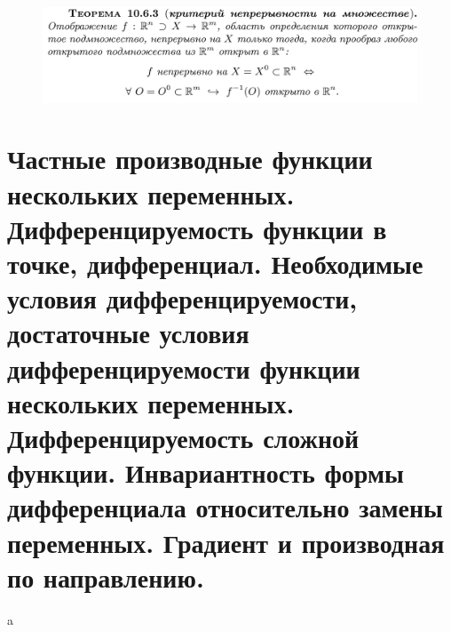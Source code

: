\documentclass{article}
\begin{document}
\newpage
\begin{figure}[h!]
    \centering
    \includegraphics[width=\textwidth]{32.png}
    \vspace{-1cm}
\end{figure}

\newpage
\section{\color{RedViolet}\textbf{Частные производные функции нескольких переменных. Дифференцируемость функции в точке, дифференциал. Необходимые условия дифференцируемости, достаточные условия дифференцируемости функции нескольких переменных. Дифференцируемость сложной функции. Инвариантность формы дифференциала относительно замены переменных. Градиент и производная по направлению.}}

a
\newpage
\end{document}
